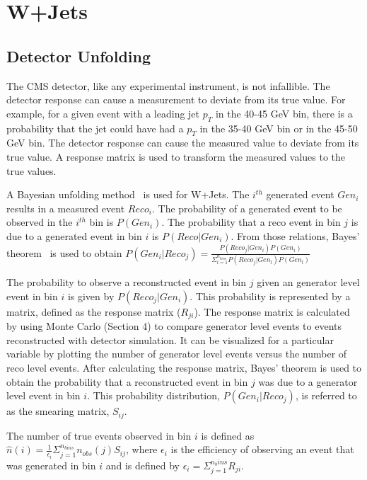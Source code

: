\documentclass[oneside, letterpaper, oldfontcommands]{memoir}
\begin{document}
{{{\section{W+Jets}
\subsection{Detector Unfolding}
\qquad The CMS detector, like any experimental instrument, is not infallible. The detector response can cause a measurement to deviate from its true value. For example, for a given event with a leading jet $p_{T}$ in the 40-45 GeV bin, there is a probability that the jet could have had a $p_{T}$ in the 35-40 GeV bin or in the 45-50 GeV bin. The detector response can cause the measured value to deviate from its true value. A response matrix is used to transform the measured values to the true values. 

\qquad A Bayesian unfolding method~\cite{D'Agostini199548} is used for W+Jets. The $i^{th}$ generated event $Gen_{i}$ results in a measured event $Reco_{i}$. The probability of a generated event to be observed in the $i^{th}$ bin is $P(Gen_{i})$. The probability that a reco event in bin $j$ is due to a generated event in bin $i$ is $P(Reco|Gen_{i})$. From those relations, Bayes' theorem~\cite{BevingtonRobinson200207} is used to obtain $P(Gen_{i}|Reco_{j}) = \frac{P(Reco_{j}|Gen_{i})P(Gen_{i})}{\Sigma_{l=1}^{n_{bins}}P(Reco_{j}|Gen_{l})P(Gen_{l})}$

\qquad The probability to observe a reconstructed event in bin $j$ given an generator level event in bin $i$ is given by $P(Reco_{j}|Gen_{i})$. This probability is represented by a matrix, defined as the response matrix ($R_{ji}$). The response matrix is calculated by using Monte Carlo (Section 4) to compare generator level events to events reconstructed with detector simulation. It can be visualized for a particular variable by plotting the number of generator level events versus the number of reco level events. After calculating the response matrix, Bayes' theorem is used to obtain the probability that a reconstructed event in bin $j$ was due to a generator level event in bin $i$. This probability distribution, $P(Gen_{i}|Reco_{j})$, is referred to as the smearing matrix, $S_{ij}$.

\qquad The number of true events observed in bin $i$ is defined as $\hat{n}(i) = \frac{1}{\epsilon_{i}}\Sigma_{j=1}^{n_{bins}}n_{obs}(j)S_{ij}$, where $\epsilon_{i}$ is the efficiency of observing an event that was generated in bin $i$ and is defined by $\epsilon_{i}=\Sigma_{j=1}^{n_bins}R_{ji}$.

}}}
\end{document}
